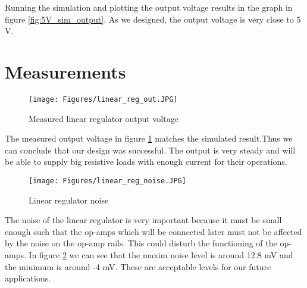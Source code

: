 Running the simulation and plotting the output voltage results in the graph in figure \ref{fig:5V_sim_output}. As we designed, the output voltage is very close to 5 V.

\section{Measurements} \label{sec:measurements_linear}

\begin{figure}[h]
    \centering
    \texttt{[image: Figures/linear\_reg\_out.JPG]}
    \caption{Measured linear regulator output voltage}
    \label{fig:linear_reg_noise_real_out}
\end{figure}

The measured output voltage in figure \ref{fig:linear_reg_noise_real_out} matches the simulated result.Thus we can conclude that our design was successful. The output is very steady and will be able to supply big resistive loads with enough current for their operations.

\begin{figure}[H]
    \centering
    \texttt{[image: Figures/linear\_reg\_noise.JPG]}
    \caption{Linear regulator noise}
    \label{fig:linear_reg_noise}
\end{figure}

The noise of the linear regulator is very important because it must be small enough such that the op-amps which will be connected later must not be affected by the noise on the op-amp rails. This could disturb the functioning of the op-amps. In figure \ref{fig:linear_reg_noise} we can see that the maxim noise level is around 12.8 mV and the minimum is around -4 mV. These are acceptable levels for our future applications.




